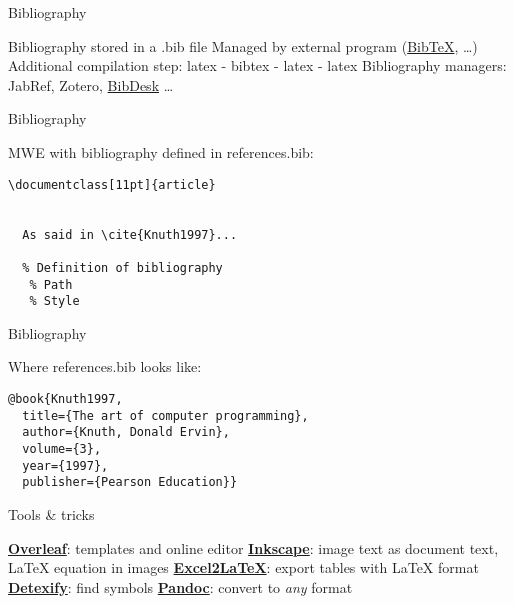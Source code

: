 \begin{frame}{Bibliography}
 \begin{fullpageitemize}
  \itemR Bibliography stored in a {\inconsolatafont .bib} file 
  \itemR Managed by external program (\href{http://www.bibtex.org/}{BibTeX}, \ldots) 
  \itemR Additional compilation step: {\inconsolatafont latex - bibtex - latex - latex}
  \itemR Bibliography managers: JabRef, Zotero, \href{https://bibdesk.sourceforge.io/}{BibDesk} \ldots
 \end{fullpageitemize}
 
\end{frame}

\begin{frame}[fragile]{Bibliography}

MWE with bibliography defined in {\inconsolatafont references.bib}:

\begin{lstlisting}[language={[LaTeX]TeX},texcsstyle=*\color{colororange}]
\documentclass[11pt]{article}
  
  
  As said in \cite{Knuth1997}...
    
  % Definition of bibliography
   % Path
   % Style

\end{lstlisting}


\end{frame}

\begin{frame}[fragile]{Bibliography}

Where {\inconsolatafont references.bib} looks like:

\begin{lstlisting}[breaklines=false]
@book{Knuth1997,
  title={The art of computer programming},
  author={Knuth, Donald Ervin},
  volume={3},
  year={1997},
  publisher={Pearson Education}}
\end{lstlisting}
\end{frame}

\begin{frame}{Tools \& tricks}
 \begin{fullpageitemize}
  \itemR \href{https://www.overleaf.com/}{\textbf{Overleaf}}: templates and online editor
  \itemR \href{http://wiki.inkscape.org/wiki/index.php/LaTeX}{\textbf{Inkscape}}: image text as document text, LaTeX equation in images
  \itemR \href{https://www.ctan.org/tex-archive/support/excel2latex/}{\textbf{Excel2LaTeX}}: export tables with LaTeX format
  \itemR \href{http://detexify.kirelabs.org/classify.html}{\textbf{Detexify}}: find symbols
  \itemR \href{http://pandoc.org/}{\textbf{Pandoc}}: convert to \emph{any} format
 \end{fullpageitemize}
 
\end{frame}

